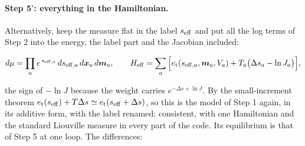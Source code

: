 \documentclass[11pt,aps,preprint,nofootinbib,superscriptaddress,tightenlines]{revtex4-2}
\def\st{\begin{equation}}
\def\stp{\end{equation}}
\let\oldparagraph\paragraph
\renewcommand{\paragraph}{\par\bigskip\oldparagraph}
\begin{document}
\paragraph{Step 5$'$: everything in the Hamiltonian.}  Alternatively, keep the measure flat in the label $s_{\rm eff}$ and put all the log terms of Step 2 into the
energy, the label part and the Jacobian included:
\begin{keyeq}
\st
d\mu=\prod_a e^{\,s_{{\rm eff},a}}\,ds_{{\rm eff},a}\,d\bm x_a\,d\bm m_a,\qquad
H_{\rm eff}=\sum_a\Big[e_{\rm t}(s_{{\rm eff},a},\bm m_a,V_a)+T_a\big(\Delta s_a-\ln J_a\big)\Big] ,
\label{seffallH}
\stp
\end{keyeq}
the sign of $-\ln J$ because the weight carries $e^{-\Delta s+\ln J}$.  By the small-increment theorem $e_{\rm t}(s_{\rm eff})+T\Delta s\simeq e_{\rm t}(s_{\rm eff}+\Delta s)$, so this is
the model of Step 1 again, in its additive form, with the label renamed: consistent, with one Hamiltonian and the standard Liouville measure in every part of the
code.  Its equilibrium is that of Step 5 at one loop.  The differences:
\end{document}
